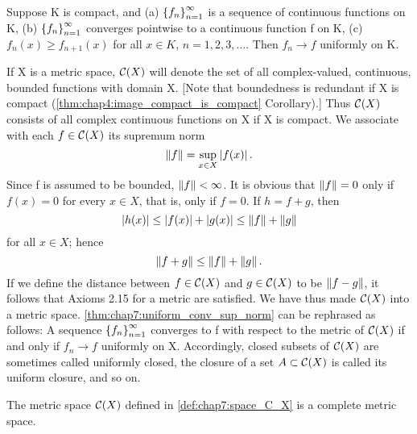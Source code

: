 
\begin{theorem} %
  \label{thm:chap7:dinis_theorem}
  Suppose K is compact, and
  (a) $\left\{ f_n \right\}_{n=1}^\infty$ is a sequence of continuous functions on K,
  (b) $\left\{ f_n \right\}_{n=1}^\infty$ converges pointwise to a continuous function f on K,
  (c) $f_n(x) \ge f_{n+1}(x)$ for all $x \in K$, $n=1, 2, 3, \dots$.
  Then $f_n \to f$ uniformly on K.
\end{theorem}


\begin{definition} %
  \label{def:chap7:space_C_X}
  If X is a metric space, $\mathcal{C}(X)$ will denote the set of all
  complex-valued, continuous, bounded functions with domain X.
  [Note that boundedness is redundant if X is compact
  (\autoref{thm:chap4:image_compact_is_compact} Corollary).] Thus
  $\mathcal{C}(X)$ consists of all complex continuous functions on X if
  X is compact.
  We associate with each $f \in \mathcal{C}(X)$ its supremum norm
  \[ \left\lVert f \right\rVert = \sup_{x \in X} \left\lvert f(x) \right\rvert. \]
  Since f is assumed to be bounded, $\left\lVert f \right\rVert < \infty$. It is
  obvious that $\left\lVert f \right\rVert=0$ only if $f(x)=0$ for every $x \in X$,
  that is, only if $f=0$. If $h=f+g$, then
  \[ \left\lvert h(x) \right\rvert \le \left\lvert f(x) \right\rvert + \left\lvert g(x) \right\rvert \le \left\lVert f \right\rVert + \left\lVert g \right\rVert \]
  for all $x \in X$; hence
  \[ \left\lVert f+g \right\rVert \le \left\lVert f \right\rVert + \left\lVert g \right\rVert. \]
  If we define the distance between $f \in \mathcal{C}(X)$ and $g \in
  \mathcal{C}(X)$ to be $\left\lVert f-g \right\rVert$, it follows that Axioms 2.15 for a
  metric are satisfied. We have thus made $\mathcal{C}(X)$ into a metric space.
  \autoref{thm:chap7:uniform_conv_sup_norm} can be rephrased as follows:
  A sequence $\left\{ f_n \right\}_{n=1}^\infty$ converges to f with respect to the metric
  of $\mathcal{C}(X)$ if and only if $f_n \to f$ uniformly on X.
  Accordingly, closed subsets of $\mathcal{C}(X)$ are sometimes called
  uniformly closed, the closure of a set $A \subset \mathcal{C}(X)$ is
  called its uniform closure, and so on.
\end{definition}

\begin{theorem}[Completeness of C(X)] %
  \label{thm:chap7:completeness_C_X}
  The metric space $\mathcal{C}(X)$ defined in
  \autoref{def:chap7:space_C_X} is a complete metric space.
\end{theorem}

